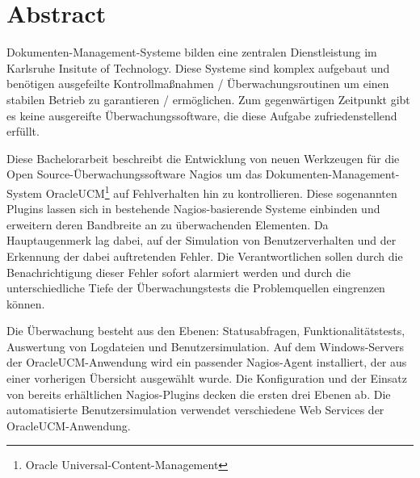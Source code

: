 \section{Abstract}


Dokumenten-Management-Systeme bilden eine zentralen Dienstleistung im Karlsruhe Insitute of Technology.
Diese Systeme sind komplex aufgebaut und benötigen ausgefeilte Kontrollmaßnahmen / Überwachungsroutinen um einen stabilen Betrieb zu garantieren / ermöglichen.
Zum gegenwärtigen Zeitpunkt gibt es keine ausgereifte Überwachungssoftware, die diese Aufgabe zufriedenstellend erfüllt.

Diese Bachelorarbeit beschreibt die Entwicklung von neuen Werkzeugen für die Open Source-Überwachungssoftware Nagios um das Dokumenten-Management-System \gls{OracleUCM}\footnote{Oracle Universal-Content-Management} auf Fehlverhalten hin zu kontrollieren.
Diese sogenannten Plugins lassen sich in bestehende Nagios-basierende Systeme einbinden und erweitern deren Bandbreite an zu überwachenden Elementen.
Da Hauptaugenmerk lag dabei, auf der Simulation von Benutzerverhalten und der Erkennung der dabei auftretenden Fehler.
Die Verantwortlichen sollen durch die Benachrichtigung dieser Fehler sofort alarmiert werden und durch die unterschiedliche Tiefe der Überwachungstests die Problemquellen eingrenzen können.

Die Überwachung besteht aus den Ebenen: Statusabfragen, Funktionalitätstests, Auswertung von Logdateien und Benutzersimulation.
Auf dem Windows-Servers der \gls{OracleUCM}-Anwendung wird ein passender Nagios-Agent installiert, der aus einer vorherigen Übersicht ausgewählt wurde.
Die Konfiguration und der Einsatz von bereits erhältlichen Nagios-Plugins decken die ersten drei Ebenen ab.
Die automatisierte Benutzersimulation verwendet verschiedene Web Services der \gls{OracleUCM}-Anwendung.


